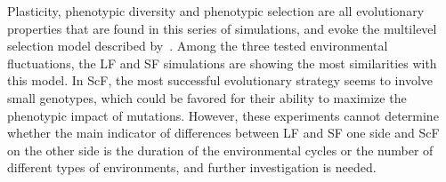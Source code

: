Plasticity, phenotypic diversity and phenotypic selection are all evolutionary properties that are found in this series of simulations, and evoke the multilevel selection model described by~\citet{jablonka2014evolution}. Among the three tested environmental fluctuations, the LF and SF simulations are showing the most similarities with this model. In ScF, the most successful evolutionary strategy seems to involve small genotypes, which could be favored for their ability to maximize the phenotypic impact of mutations. However, these experiments cannot determine whether the main indicator of differences between LF and SF one side and ScF on the other side is the duration of the environmental cycles or the number of different types of environments, and further investigation is needed.
